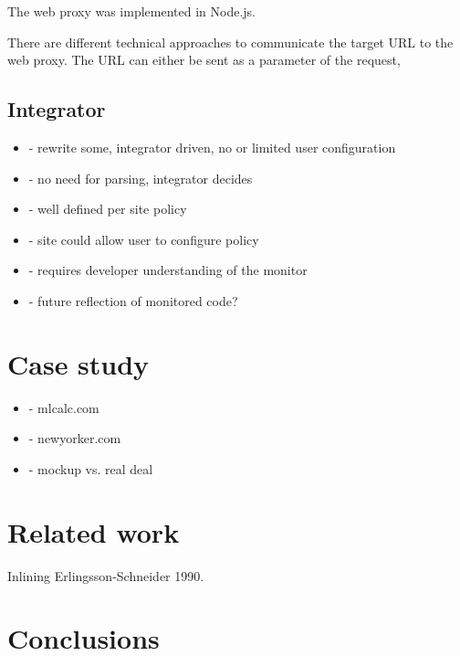 \documentclass{llncs}
\begin{document}
The web proxy was implemented in Node.js. 

There are different technical approaches to communicate the target URL to the web 
proxy. The URL can either be sent as a parameter of the request, 

\subsection{Integrator}

\begin{itemize}
\item- rewrite some, integrator driven, no or limited user configuration
\item- no need for parsing, integrator decides
\item- well defined per site policy
\item- site could allow user to configure policy
\item- requires developer understanding of the monitor
\item- future reflection of monitored code?
\end{itemize}


\section{Case study}
\label{sec:case}

\begin{itemize}
\item- mlcalc.com
\item- newyorker.com
\item- mockup vs. real deal
\end{itemize}

\section{Related work}
\label{sec:related}

Inlining Erlingsson-Schneider 1990.

\section{Conclusions}
\label{sec:conc}



\end{document}
